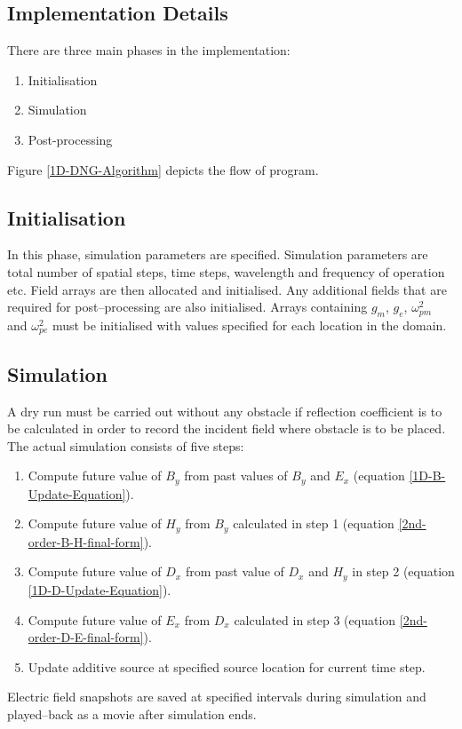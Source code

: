 \subsection{Implementation Details}
There are three main phases in the implementation:
\begin{enumerate}
\item Initialisation
\item Simulation
\item Post-processing
\end{enumerate}
Figure \ref{1D-DNG-Algorithm} depicts the flow of program.
\subsection{Initialisation}
In this phase, simulation parameters are specified. Simulation parameters are total number of spatial steps, time steps, wavelength and frequency of operation etc. Field arrays are then allocated and initialised. Any additional fields that are required for post--processing are also initialised. Arrays containing $g_m$, $g_e$, $\omega^2_{pm}$ and $\omega^2_{pe}$ must be initialised with values specified for each location in the domain.
\subsection{Simulation}
A dry run must be carried out without any obstacle if reflection coefficient is to be calculated in order to record the incident field where obstacle is to be placed. The actual simulation consists of five steps:
\begin{enumerate}
\item Compute future value of $B_y$ from past values of $B_y$ and $E_x$ (equation \ref{1D-B-Update-Equation}).
\item Compute future value of $H_y$ from $B_y$ calculated in step 1 (equation \ref{2nd-order-B-H-final-form}).
\item Compute future value of $D_x$ from past value of $D_x$ and $H_y$ in step 2 (equation \ref{1D-D-Update-Equation}).
\item Compute future value of $E_x$ from $D_x$ calculated in step 3 (equation \ref{2nd-order-D-E-final-form}).
\item Update additive source at specified source location for current time step.
\end{enumerate}
Electric field snapshots are saved at specified intervals during simulation and played--back as a movie after simulation ends. 
